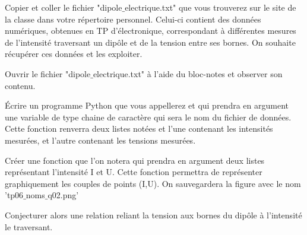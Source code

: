 Copier et coller le fichier "dipole$\_$electrique.txt" que vous trouverez sur le site de la classe dans votre répertoire personnel. Celui-ci contient des données numériques, obtenues en TP d’électronique, correspondant à différentes mesures de l'intensité traversant un dipôle et de la tension entre ses bornes. On souhaite récupérer ces données et les exploiter.

Ouvrir le fichier "dipole$\_$electrique.txt" à l'aide du bloc-notes et observer son contenu.

\question{}Écrire un programme Python que vous appellerez  et qui prendra en argument une variable de type chaine de caractère qui sera le nom du fichier de données. Cette fonction renverra deux listes notées  et   l'une contenant les intensités mesurées, et l'autre contenant les
tensions mesurées.

\question{}Créer une fonction que l'on notera   qui prendra en argument deux listes représentant l'intensité I et U. Cette fonction permettra de représenter graphiquement les couples de points (I,U). On sauvegardera la figure avec le nom 'tp06$\_$noms$\_$q02.png'



\question{}Conjecturer alors une relation reliant la tension aux bornes du dipôle à l'intensité le traversant.